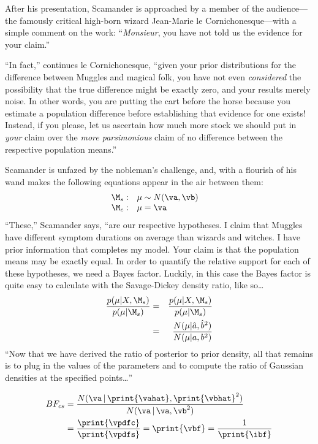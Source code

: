 After his presentation, Scamander is approached by a member of the audience---the famously critical high-born wizard Jean-Marie le Cornichonesque---with a simple comment on the work: ``\emph{Monsieur}, you have not told us the evidence for your claim.''

``In fact,'' continues le Cornichonesque, ``given your prior distributions for the difference between Muggles and magical folk, you have not even \emph{considered} the possibility that the true  difference might be exactly zero, and your results merely noise. In other words, you are putting the cart before the horse because you estimate a population difference before establishing that {evidence for} one exists! Instead, if you please, let us ascertain how much more stock we should put in \textit{your} claim over the \textit{more parsimonious} claim of no difference between the respective population means.'' 

Scamander is unfazed by the nobleman's challenge, and, with a flourish of his wand makes the following equations appear in the air between them:
$$\begin{array}{rll}
\M_s: & \mu \sim N(\va, \vb) & \\
\M_c: & \mu   =  \va         & 
\end{array}$$
``These,'' Scamander says, ``are our respective hypotheses. I claim that Muggles have different symptom durations on average than wizards and witches. I have prior information that completes my model. Your claim is that the population means may be exactly equal. In order to quantify the relative support for each of these hypotheses, we need a Bayes factor. Luckily, in this case the Bayes factor is quite easy to calculate with the Savage-Dickey density ratio, like so\dots
\begin{eqnarray*}
\frac{p(\mu| X, \M_s)}{p(\mu|\M_s)}
   &=& \frac{p(\mu| X,\M_s)}{p(\mu|\M_s)} \\
   &=& \frac{N(\mu| \hat{a}, \hat{b}^2)}{N(\mu|a,b^2)}
\end{eqnarray*}
``Now that we have derived the ratio of posterior to prior density, all that remains is to plug in the values of the parameters and to compute the ratio of Gaussian densities at the specified points\dots''

\begin{align*}
BF_{cs} &=  \frac{N(\va \,|\, \print{\vahat}, \print{\vbhat}^2)}{N(\va \,|\, \va, \vb^2)}\\
        &=  \frac{\print{\vpdfc}}{\print{\vpdfs}} = \print{\vbf} = \frac{1}{\print{\ibf}}
\end{align*}

